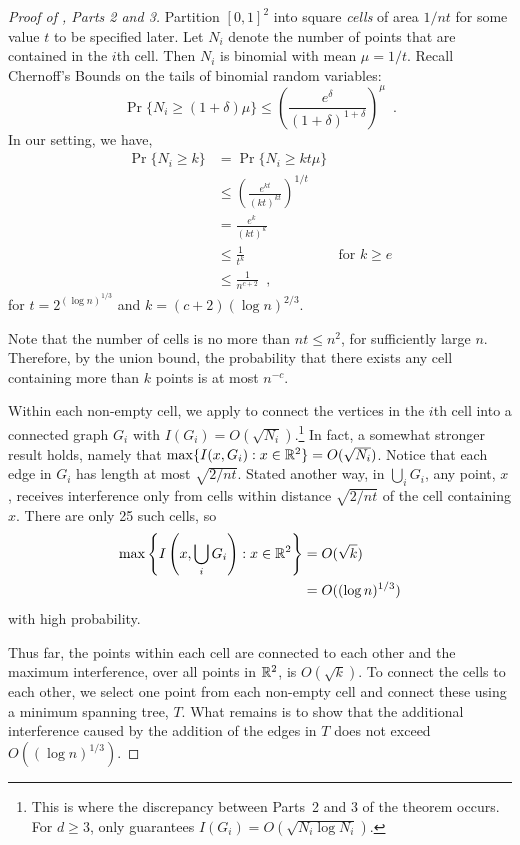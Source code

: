 \documentclass{patmorin}
\begin{document}
\begin{proof}[Proof of , Parts 2 and 3]
Partition $[0,1]^2$ into square \emph{cells} of area $1/nt$ for some
value $t$ to be specified later.  Let $N_i$ denote the number of points
that are contained in the $i$th cell.  Then $N_i$ is binomial
with mean $\mu=1/t$.  Recall Chernoff's Bounds \cite{c52} on the tails
of binomial random variables:
\[
  \Pr\{N_i \ge (1+\delta)\mu\} 
    \le \left(\frac{e^\delta}{(1+\delta)^{1+\delta}}\right)^\mu \enspace .
\]
In our setting, we have, 
\begin{align*}
  \Pr\{N_i \ge k\} 
    & = \Pr\{N_i \ge kt\mu\} \\
    & \le \left(\frac{e^{kt}}{(kt)^{kt}}\right)^{1/t} \\
    & = \frac{e^{k}}{(kt)^{k}} \\
    & \le \frac{1}{t^{k}} & \text{for $k\ge e$} \\
    & \le \frac{1}{n^{c+2}} \enspace , 
\end{align*}
for $t=2^{(\log n)^{1/3}}$ and $k=(c+2)(\log n)^{2/3}$.

Note that the number of cells is no more than $nt\le
n^2$, for sufficiently large $n$.  Therefore, by the union bound, the
probability that there exists any cell containing more than $k$ points
is at most $n^{-c}$.

Within each non-empty cell, we apply  to
connect the vertices in the $i$th cell into a connected graph $G_i$
with $I(G_i)=O(\sqrt{N_i})$.\footnote{This is where the discrepancy between Parts~2 and 3 of the theorem occurs.  For $d\ge 3$,  only guarantees $I(G_i)=O(\sqrt{N_i\log N_i})$.}  In fact, a somewhat stronger result holds,
namely that $\max\{I(x,G_i) : x\in\mathbb{R}^2\}=O(\sqrt{N_i})$.  Notice that
each edge in $G_i$ has length at most $\sqrt{2/nt}$.  Stated another
way, in $\bigcup_i G_i$, any point, $x$, receives interference only
from cells within distance $\sqrt{2/nt}$ of the cell containing $x$.
There are only 25 such cells, so
\begin{align*}
  \max\left\{I\left(x,\bigcup_iG_i\right) : x\in\mathbb{R}^2\right\}
   & = O(\sqrt{k})  \\
   & = O((\log n)^{1/3})
\end{align*}
with high probability.

Thus far, the points within each cell are connected to each other and
the maximum interference, over all points in $\mathbb{R}^2$, is $O(\sqrt{k})$.
To connect the cells to each other, we select one point from each
non-empty cell and connect these using a minimum spanning tree, $T$.
What remains is to show that the additional interference caused by the
addition of the edges in $T$ does not exceed $O((\log n)^{1/3})$.


\end{proof}
\end{document}
